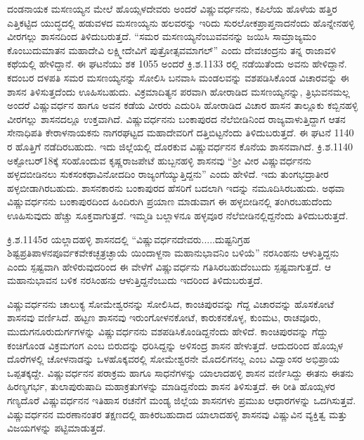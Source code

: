 ದಂಡನಾಯಕ ಮಸಣಯ್ಯನ ಮೇಲೆ ಹೊಯ್ಸಳದೇವರು ಅಂದರೆ ವಿಷ್ಣುವರ್ಧನನು, ಕಪಿಲೆಯ ಹೊಳೆಯ ಹತ್ತಿರ ಎತ್ತಿಕಟ್ಟಿದ ಯುದ್ಧದಲ್ಲಿ ಹಡುವಳದ ಮಸಣಯ್ಯನು ಹಲವರನ್ನು ಇರಿದು ಸುರಲೋಕಪ್ರಾಪ್ತನಾದನೆಂದು ಹೊನ್ನೇನಹಳ್ಳಿ ವೀರಗಲ್ಲು ಶಾಸನದಿಂದ ತಿಳಿದುಬರುತ್ತದೆ. “ಸಮರ ಮಸಣಯ್ಯನೆಂಬುವವನನ್ನು ಜಯಿಸಿ ಸಾಮ್ರಾಜ್ಯಮಂ ಕೊಂಬುದುಮಾತನ ಮಹಾದೇವಿ ಲಕ್ಷ್ಮೀದೇವಿಗೆ ಪುತ್ರೋತ್ಸವಮಾಗಲ್​” ಎಂದು ದೇವಚಂದ್ರನು ತನ್ನ ರಾಜಾವಳಿ ಕಥೆಯಲ್ಲಿ ಹೇಳಿದ್ದಾನೆ. ಈ ಘಟನೆಯು ಶಕ 1055 ಅಂದರೆ ಕ್ರಿ.ಶ.1133 ರಲ್ಲಿ ನಡೆಯಿತೆಂದು ಅವನು ಹೇಳಿದ್ದಾನೆ. ಕದಂಬರ ದಳಪತಿ ಸಮರ ಮಸಣಯ್ಯನನ್ನು ಸೋಲಿಸಿ ಬನವಾಸಿ ಮಂಡಲವನ್ನು ವಶಪಡಿಸಿಕೊಂಡ ವಿಚಾರವನ್ನು ಈ ಶಾಸನ ತಿಳಿಸುತ್ತದೆಂದು ಊಹಿಸಬಹುದು. ವಿಕ್ರಮಾದಿತ್ಯನ ಪರವಾಗಿ ಹೋರಾಡಿದ ಮಸಣಯ್ಯನನ್ನು, ತ್ರಿಭುವನಮಲ್ಲ ಅಂದರೆ ವಿಷ್ಣುವರ್ಧನ ಹಾಗೂ ಅವನ ಕಡೆಯ ವೀರರು ಎದುರಿಸಿ ಹೋರಾಡಿದ ವಿಚಾರ ಹಾಸನ ತಾಲ್ಲೂಕು ಕಬ್ಬಿನಹಳ್ಳಿ ವೀರಗಲ್ಲು ಶಾಸನದಲ್ಲೂ ಉಕ್ತವಾಗಿದೆ. ವಿಷ್ಣುವರ್ಧನನು ಬಂಕಾಪುರದ ನೆಲೆಬೀಡಿನಿಂದ ರಾಜ್ಯವಾಳುತ್ತಿದ್ದಾಗ ಆತನ ಸೇನಾಧಿಪತಿ ಕೇರಾಳನಾಯಕನು ನಾಗರಘಟ್ಟದ ಮಹಾದೇವರಿಗೆ ದತ್ತಿಬಿಟ್ಟನೆಂದು ತಿಳಿದುಬರುತ್ತದೆ. ಈ ಘಟನೆ 1140 ರ ಹೊತ್ತಿಗೆ ನಡೆದಿರಬಹುದು. ಇದು ಜಿಲ್ಲೆಯಲ್ಲಿ ದೊರಕುವ ವಿಷ್ಣುವರ್ಧನನ ಕೊನೆಯ ಶಾಸನವಾಗಿದೆ. ಕ್ರಿ.ಶ.1140 ಅಕ್ಟೋಬರ್​ 18ಕ್ಕೆ ಸರಿಹೊಂದುವ ಕೃಷ್ಣರಾಜಪೇಟೆ ಹುಬ್ಬನಹಳ್ಳಿ ಶಾಸನವು “ಶ‍್ರೀ ವೀರ ವಿಷ್ಣುವರ್ಧನನು ಹಳ್ಳದಬೀಡಿನಲು ಸುಕಸಂಕಥಾವಿನೋದದಿಂ ರಾಜ್ಯಂಗೆಯ್ಯುತ್ತಿದ್ದನು” ಎಂದು ಹೇಳಿದೆ. ಇದು ತುಂಗಭದ್ರಾತೀರ ಹಳ್ಳಬೀಡಾಗಿರಬಹುದು. ಶಾಸನಕಾರನು ಬಂಕಾಪುರದ ಹೆಸರಿಗೆ ಬದಲಾಗಿ ಇದನ್ನು ನಮೂದಿಸಿರಬಹುದು. ಅಥವಾ ವಿಷ್ಣುವರ್ಧನನು ಬಂಕಾಪುರದಿಂದ ಹಿಂದಿರುಗಿ ಪ್ರಯಾಣ ಮಾಡುವಾಗ ಈ ಹಳ್ಳಬೀಡಿನಲ್ಲಿ ತಂಗಿರಬಹುದೆಂದು ಊಹಿಸುವುದು ಹೆಚ್ಚು ಸೂಕ್ತವಾಗುತ್ತದೆ. ಇಮ್ಮಡಿ ಬಲ್ಲಾಳನೂ ಹಳ್ಳವೂರ ನೆಲೆಬೀಡಿನಲ್ಲಿದ್ದನೆಂದು ತಿಳಿದುಬರುತ್ತದೆ.

ಕ್ರಿ.ಶ.1145ರ ಯಲ್ಲಾದಹಳ್ಳಿ ಶಾಸನದಲ್ಲಿ “ವಿಷ್ಣುವರ್ಧನದೇವರು.....ದುಷ್ಟನಿಗ್ರಹ ಶಿಷ್ಟಪ್ರತಿಪಾಳನ\break ಪೂರ್ವಕವೇಕಚ್ಛತ್ರಚ್ಛಾಯೆ ಯಿಂದಾಳ್ದನಾ ಮಹಾನುಭಾವನಿಂ ಬಳಿಯೆ” ನರಸಿಂಹನು ಆಳುತ್ತಿದ್ದನು ಎಂದು ಸ್ಪಷ್ಟವಾಗಿ ಹೇಳಿರುವುದರಿಂದ ಈ ವೇಳೆಗೆ ವಿಷ್ಣುವರ್ಧನು ಗತಿಸಿರಬಹುದೆಂಬುದು ಸ್ಪಷ್ಟವಾಗುತ್ತದೆ. ಆ ಮಹಾನುಭಾವನ ಬಳಿಕ ನರಸಿಂಹನು ಆಳುತ್ತಿದ್ದನೆಂಬುದು ಇದರಿಂದ ತಿಳಿದುಬರುತ್ತದೆ. 

ವಿಷ್ಣುವರ್ಧನನು ಚಾಲುಕ್ಯ ಸೋಮೇಶ್ವರನನ್ನು ಸೋಲಿಸಿದ, ಕಾಂಚಿಪುರವನ್ನು ಗೆದ್ದ ವಿಚಾರವನ್ನು ಹೊಸಕೋಟೆ ಶಾಸನವು ವರ್ಣಿಸಿದೆ. ಹಟ್ಟಣ ಶಾಸನವು ಇರುಂಗೋಳನಕೋಟೆ, ಕಾರುಕನಕೊಳ್ಳ, ಕುಂಮಟ, ರಾಚವೂರು, ಮುದುಗನೂರುದುರ್ಗ\-ಗಳನ್ನು ವಿಷ್ಣುವರ್ಧನನು ವಶಪಡಿಸಿಕೊಂಡಿದ್ದನೆಂದು ಹೇಳಿದೆ. ಕಾಂಚಿಪುರವನ್ನು ಗೆದ್ದು ಕಂಚಿಗೊಂಡ ವಿಕ್ರಮಗಂಗ ಎಂಬ ಬಿರುದನ್ನು ಧರಿಸಿದ್ದನ್ನು ಅಳಿಸಂದ್ರ ಶಾಸನ ಹೇಳುತ್ತದೆ. ಆದುದರಿಂದ ಹೊಯ್ಸಳ ದೊರೆಗಳಲ್ಲಿ ಚೋಳನಾಡನ್ನು ಒಳಹೊಕ್ಕವರಲ್ಲಿ ಸೋಮೇಶ್ವರನೇ ಮೊದಲಿಗನಲ್ಲ ಎಂಬ ವಿದ್ವಾಂಸರ ಅಭಿಪ್ರಾಯ ಒಪ್ಪತಕ್ಕದ್ದೇ. ವಿಷ್ಣುವರ್ಧನನ ಪರಾಕ್ರಮ ಹಾಗೂ ಸಾಧನೆಗಳನ್ನು ಯಾಲಾದಹಳ್ಳಿ ಶಾಸನ ವರ್ಣಿಸಿದ್ದು ಈತನು ಈತನು ಹಿರಣ್ಯಗರ್ಭ, ತುಲಾಪುರುಷಾದಿ ಮಹಾಕ್ರತುಗಳನ್ನು ಮಾಡಿದ್ದನೆಂದು ಶಾಸನ ತಿಳಿಸುತ್ತದೆ. ಈ ರೀತಿ ಹೊಯ್ಸಳರ ಗಣ್ಯದೊರೆ ವಿಷ್ಣುವರ್ಧನನ ಇತಿಹಾಸ ರಚನೆಗೆ ಮಂಡ್ಯ ಜಿಲ್ಲೆಯ ಶಾಸನಗಳು ಪ್ರಮುಖ ಆಧಾರಗಳನ್ನು ಒದಗಿಸುತ್ತವೆ. ವಿಷ್ಣುವರ್ಧನನ ಮರಣಾನಂತರ ತಕ್ಷಣದಲ್ಲಿ ಹಾಕಿರಬಹುದಾದ ಯಾಲಾದಹಳ್ಳಿ ಶಾಸನವು ವಿಷ್ಣುವಿನ ವ್ಯಕ್ತಿತ್ವ ಮತ್ತು ವಿಜಯಗಳನ್ನು ಪಟ್ಟಿಮಾಡುತ್ತದೆ. 

